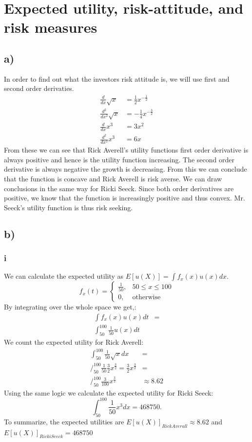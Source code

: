 \documentclass{article}
\begin{document}
\section{Expected utility, risk-attitude, and risk measures}
\subsection{a)}
	In order to find out what the investors risk attitude is, we will use first and second order derivaties. 
	\begin{align}
		\frac{d}{dx}\sqrt{x} &= \frac{1}{2}x^{-\frac{1}{2}} \\
		\frac{d^2}{dx^2}\sqrt{x} &= -\frac{1}{4}x^{-\frac{3}{2}} \\
		\frac{d}{dx}x^3 &=  3x^2\\
		\frac{d^2}{dx^2}x^3 &= 6x
	\end{align}
	From these we can see that Rick Averell's utility functions first order derivative is always positive and hence is the utility function increasing. The second order derivative is always negative the growth is decreasing. From this we can conclude that the function is concave and Rick Averell is risk averse.
	We can draw conclusions in the same way for Ricki Seeck. Since both order derivatives are positive, we know that the function is increasingly positive and thus convex. Mr. Seeck's utility function is thus risk seeking. 
\subsection{b)}
\subsubsection{i}
	We can calculate the expected utility as $E[u(X)] = \int f_x(x) u(x)dx$. 
	\begin{equation}
		f_x(t) = 
		\begin{cases}
			 \frac{1}{50}, &  50 \leq x \leq 100 \\
			 0, & \mbox{otherwise}
		\end{cases}
	\end{equation}
	By integrating over the whole space we get,:
	\begin{align}
		\int f_x(x) u(x)dt &= \\
		\int_{50}^{100} \frac{1}{50} u(x) dt& 
	\end{align}
	We count the expected utility for Rick Averell:
	\begin{align}
		\int_{50}^{100} \frac{1}{50} \sqrt{x} dx &=  \\
		\Bigg/_{50}^{100} \frac{1}{50} \frac{3}{2} x^{\frac{3}{2}} = \frac{3}{2} x^{\frac{3}{2}} &= \\
		\Bigg/_{50}^{100} \frac{3}{100} x^{\frac{3}{2}}	& \approx 8.62		
	\end{align}
	Using the same logic we calculate the expected utility for Ricki Seeck:
	\begin{equation}
		\int_{50}^{100} \frac{1}{50} x^3 dx  = 468750.	
	\end{equation}
	To summarize, the expected utilities are $E[u(X)]_{Rick Averall} \approx 8.62$ and $E[u(X)]_{Ricki Seeck} = 468750$
	
\end{document}
